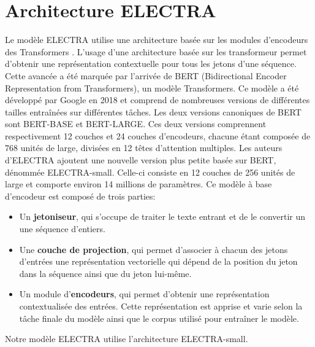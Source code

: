 \documentclass[12pt,twoside,rapport]{dms}
\theoremstyle{definition}
\numberwithin{equation}{section}
\numberwithin{table}{chapter}
\numberwithin{figure}{chapter}
\begin{document}
\section{Architecture ELECTRA}
Le modèle ELECTRA utilise une architecture basée sur les modules d'encodeurs
des Transformers \cite{vaswani2023attentionneed}. L'usage d'une architecture
basée sur les transformeur permet d'obtenir une représentation contextuelle
pour tous les jetons d'une séquence. Cette avancée a été marquée par l'arrivée
de BERT \cite{bert} (Bidirectional Encoder Representation from Transformers), un
modèle Transformers. Ce modèle a été développé par Google en 2018 et comprend
de nombreuses versions de différentes tailles entraînées sur différentes
tâches. Les deux versions canoniques de BERT sont BERT-BASE et BERT-LARGE. Ces
deux versions comprennent respectivement 12 couches et 24 couches d'encodeurs,
chacune étant composée de 768 unités de large, divisées en 12 têtes d’attention
multiples. Les auteurs d'ELECTRA ajoutent une nouvelle version plus petite basée
sur BERT, dénommée ELECTRA-small. Celle-ci consiste en 12 couches de 256 unités
de large et comporte environ 14 millions de paramètres. Ce modèle à base
d'encodeur est composé de trois parties:
\begin{itemize}
	\item Un \textbf{jetoniseur}, qui s'occupe de traiter le texte entrant et
	      de le convertir un une séquence d'entiers.
	\item Une \textbf{couche de projection}, qui permet d'associer à chacun des
	      jetons d'entrées une représentation vectorielle qui dépend de la
	      position du jeton dans la séquence ainsi que du jeton lui-même.
	\item Un module d'\textbf{encodeurs}, qui permet d'obtenir une
	      représentation contextualisée des entrées. Cette représentation est
	      apprise et varie selon la tâche finale du modèle ainsi que le corpus
	      utilisé pour entraîner le modèle.
\end{itemize}
Notre modèle ELECTRA utilise l'architecture ELECTRA-small.
\end{document}
